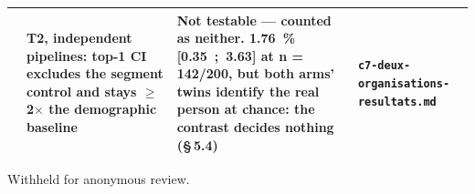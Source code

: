 \documentclass[sigconf,anonymous,review]{acmart}
\begin{document}
\begin{table}[t]
\begin{tabular}{@{}>{\raggedright\arraybackslash}p{}>{\raggedright\arraybackslash}p{}>{\raggedright\arraybackslash}p{}>{\raggedright\arraybackslash}p{}@{}}
    17 & T2, independent pipelines: top-1 CI excludes the segment control and stays $\geq$ 2$\times$ the demographic baseline & \textbf{Not testable --- counted as neither.} 1.76~\% [0.35~;~3.63] at n = 142/200, but both arms' twins identify the real person at chance: the contrast decides nothing (\S\,5.4) & \texttt{c7-\allowbreak{}deux-\allowbreak{}organisations-\allowbreak{}resultats\allowbreak{}.md} \\
    \bottomrule
  \end{tabular}
\end{table}

\begin{acks}
Withheld for anonymous review.
\end{acks}
\end{document}
